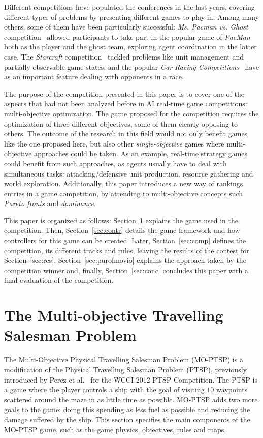 \documentclass[conference]{IEEEtran}
\begin{document}
Different competitions have populated the conferences in the last years, covering different types of problems by presenting different games to play in. Among many others, some of them have been particularly successful: \textit{Ms. Pacman vs. Ghost} competition~\cite{Philipp2011} allowed participants to take part in the popular game of \textit{PacMan} both as the player and the ghost team, exploring agent coordination in the latter case. The \textit{Starcraft} competition~\cite{Weber2011} tackled problems like unit management and partially observable game states, and the popular \textit{Car Racing Competitions}~\cite{Loiacono2010} have as an important feature dealing with opponents in a race.

The purpose of the competition presented in this paper is to cover one of the aspects that had not been analyzed before in AI real-time game competitions: multi-objective optimization. The game proposed for the competition requires the optimization of three different objectives, some of them clearly opposing to others. The outcome of the research in this field would not only benefit games like the one proposed here, but also other \textit{single-objective} games where multi-objective approaches could be taken. As an example, real-time strategy games could benefit from such approaches, as agents usually have to deal with simultaneous tasks: attacking/defensive unit production, resource gathering and world exploration. Additionally, this paper introduces a new way of rankings entries in a game competition, by attending to multi-objective concepts such \textit{Pareto fronts} and \textit{dominance}.

This paper is organized as follows: Section~\ref{sec:moptsp} explains the game used in the competition. Then, Section~\ref{sec:contr} details the game framework and how controllers for this game can be created. Later, Section~\ref{sec:comp} defines the competition, its different tracks and rules, leaving the results of the contest for Section~\ref{sec:res}. Section~\ref{sec:purofmovio} explains the approach taken by the competition winner and, finally, Section~\ref{sec:conc} concludes this paper with a final evaluation of the competition.

\section{The Multi-objective Travelling Salesman Problem} \label{sec:moptsp}

The Multi-Objective Physical Travelling Salesman Problem (MO-PTSP) is a modification of the Physical Travelling Salesman Problem (PTSP), previously introduced by Perez et al.~\cite{PerezCEC2012} for the WCCI 2012 PTSP Competition. The PTSP is a game where the player controls a ship with the goal of visiting $10$ waypoints scattered around the maze in as little time as possible. MO-PTSP adds two more goals to the game: doing this spending as less fuel as possible and reducing the damage suffered by the ship. This section specifies the main components of the MO-PTSP game, such as the game physics, objectives, rules and maps. 
\end{document}
